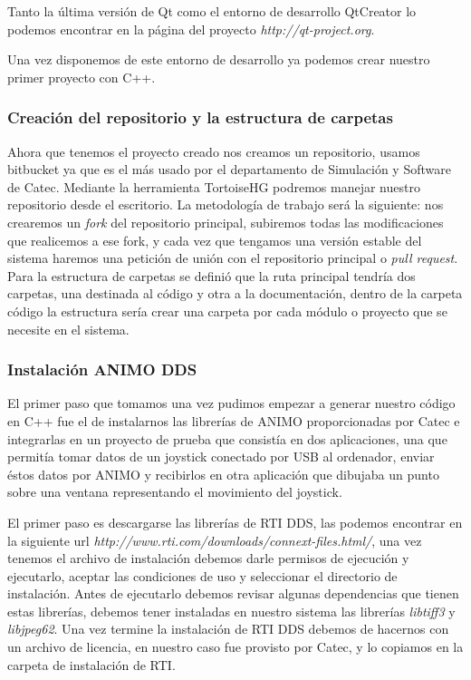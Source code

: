 \documentclass[12pt,a4paper,spanish]{book} %
\begin{document}
Tanto la última versión de Qt como el entorno de desarrollo QtCreator lo podemos encontrar en la página del proyecto \emph{http://qt-project.org}.

Una vez disponemos de este entorno de desarrollo ya podemos crear nuestro primer proyecto con C++.

\subsubsection{Creación del repositorio y la estructura de carpetas}

Ahora que tenemos el proyecto creado nos creamos un repositorio, usamos bitbucket ya que es el más usado por el departamento de Simulación y Software de Catec. Mediante la herramienta TortoiseHG podremos manejar nuestro repositorio desde el escritorio. La metodología de trabajo será la siguiente: nos crearemos un \emph{fork} del repositorio principal, subiremos todas las modificaciones que realicemos a ese fork, y cada vez que tengamos una versión estable del sistema haremos una petición de unión con el repositorio principal o \emph{pull request}. Para la estructura de carpetas se definió que la ruta principal tendría dos carpetas, una destinada al código y otra a la documentación, dentro de la carpeta código la estructura sería crear una carpeta por cada módulo o proyecto que se necesite en el sistema.

\subsubsection{Instalación ANIMO DDS}

El primer paso que tomamos una vez pudimos empezar a generar nuestro código en C++ fue el de instalarnos las librerías de ANIMO proporcionadas por Catec e integrarlas en un proyecto de prueba que consistía en dos aplicaciones, una que permitía tomar datos de un joystick conectado por USB al ordenador, enviar éstos datos por ANIMO y recibirlos en otra aplicación que dibujaba un punto sobre una ventana representando el movimiento del joystick.

El primer paso es descargarse las librerías de RTI DDS, las podemos encontrar en la siguiente url \emph{http://www.rti.com/downloads/connext-files.html/}, una vez tenemos el archivo de instalación debemos darle permisos de ejecución y ejecutarlo, aceptar las condiciones de uso y seleccionar el directorio de instalación. Antes de ejecutarlo debemos revisar algunas dependencias que tienen estas librerías, debemos tener instaladas en nuestro sistema las librerías \emph{libtiff3} y \emph{libjpeg62}. Una vez termine la instalación de RTI DDS debemos de hacernos con un archivo de licencia, en nuestro caso fue provisto por Catec, y lo copiamos en la carpeta de instalación de RTI.
\end{document}
